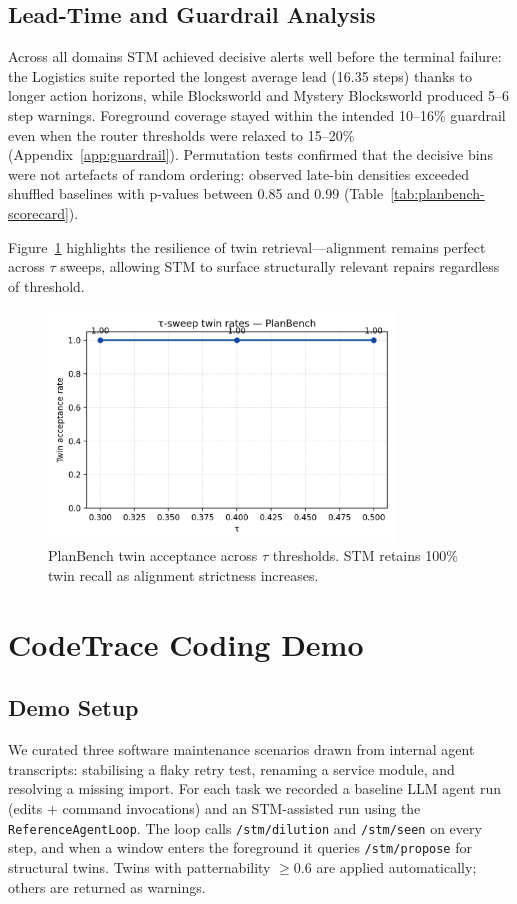 \documentclass[11pt]{article}
\begin{document}
\subsection{Lead-Time and Guardrail Analysis}
Across all domains STM achieved decisive alerts well before the terminal failure: the Logistics suite reported the longest average lead (16.35 steps) thanks to longer action horizons, while Blocksworld and Mystery Blocksworld produced 5--6 step warnings. Foreground coverage stayed within the intended 10--16\% guardrail even when the router thresholds were relaxed to 15--20\% (Appendix~\ref{app:guardrail}). Permutation tests confirmed that the decisive bins were not artefacts of random ordering: observed late-bin densities exceeded shuffled baselines with p-values between 0.85 and 0.99 (Table~\ref{tab:planbench-scorecard}).

Figure~\ref{fig:tau-planbench} highlights the resilience of twin retrieval---alignment remains perfect across \(\tau\) sweeps, allowing STM to surface structurally relevant repairs regardless of threshold.

\begin{figure}[h]
  \centering
  \includegraphics[width=0.82\textwidth]{../note/fig_tau_sweep_planbench.png}
  \caption{PlanBench twin acceptance across \(\tau\) thresholds. STM retains 100\% twin recall as alignment strictness increases.}
  \label{fig:tau-planbench}
\end{figure}

\section{CodeTrace Coding Demo}
\subsection{Demo Setup}
We curated three software maintenance scenarios drawn from internal agent transcripts: stabilising a flaky retry test, renaming a service module, and resolving a missing import. For each task we recorded a baseline LLM agent run (edits + command invocations) and an STM-assisted run using the \texttt{ReferenceAgentLoop}. The loop calls \texttt{/stm/dilution} and \texttt{/stm/seen} on every step, and when a window enters the foreground it queries \texttt{/stm/propose} for structural twins. Twins with patternability \(\geq 0.6\) are applied automatically; others are returned as warnings.
\end{document}
